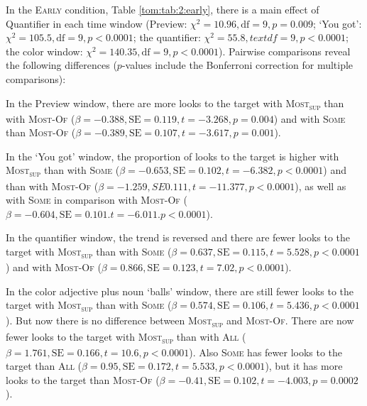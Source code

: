 \documentclass[output=paper]{langscibook}
\begin{document}
In the \textsc{Early} condition, Table \ref{tom:tab:2:early}, there is a main effect of Quantifier in each time window (Preview: $\chi^2=10.96, \text{df}=9,
p=0.009$; `You got': $\chi^2=105.5, \text{df}=9, p<0.0001$; the quantifier: $\chi^2=55.8, 
text{df}=9,
p<0.0001$; the color window: $\chi^2=140.35, \text{df}=9, p<0.0001$). Pairwise
comparisons reveal the following differences ($p$-values include the Bonferroni correction for multiple comparisons):

In the Preview window, there are more looks to the target with \textsc{Most\textsubscript{sup}} than with
\textsc{Most-Of} ($\beta =-0.388, \text{SE}=0.119, t=-3.268, p=0.004$) and with \textsc{Some} than
\textsc{Most-Of} ($\beta =-0.389, \text{SE}=0.107, t=-3.617, p=0.001$).

In the `You got' window, the proportion of looks to the target is higher with \textsc{Most\textsubscript{sup}} than with
\textsc{Some} ($\beta =-0.653, \text{SE}=0.102, t=-6.382, p<0.0001$) and than with
\textsc{Most-Of} ($\beta =-1.259, SE 0.111, t=-11.377, p<0.0001$), as well as with
\textsc{Some} in comparison with \textsc{Most-Of} ($\beta =-0.604, \text{SE}=0.101. t=-6.011.
p<0.0001$).

In the quantifier window, the trend is reversed and there are fewer looks to the target with
\textsc{Most\textsubscript{sup}} than with \textsc{Some} ($\beta =0.637, \text{SE}=0.115, t=5.528,
p<0.0001$) and with \textsc{Most-Of} ($\beta =0.866, \text{SE}=0.123, t=7.02,
p<0.0001$).

In the color adjective plus noun `balls' window, there are still fewer looks to the target with
\textsc{Most\textsubscript{sup}} than with \textsc{Some} ($\beta =0.574, \text{SE}=0.106, t=5.436,
p<0.0001$). But now there is no difference between \textsc{Most\textsubscript{sup}} and
\textsc{Most-Of}. There are now fewer looks to the target with \textsc{Most\textsubscript{sup}} than with \textsc{All}
($\beta =1.761, \text{SE}=0.166, t=10.6, p<0.0001$). Also \textsc{Some} has fewer looks to the
target than \textsc{All} ($\beta =0.95, \text{SE}=0.172, t=5.533, p<0.0001$), but it has more
looks to the target than \textsc{Most-Of} ($\beta =-0.41, \text{SE}=0.102, t=-4.003, p=0.0002$).

\end{document}
